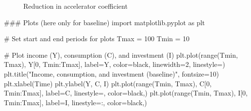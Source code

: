 \documentclass[
  letterpaper,
  DIV=11,
  numbers=noendperiod]{scrreprt}
\newenvironment{Shaded}{\begin{snugshade}}{\end{snugshade}}
\newcommand{\BuiltInTok}[1]{\textcolor[rgb]{0.00,0.23,0.31}{#1}}
\newcommand{\CommentTok}[1]{\textcolor[rgb]{0.37,0.37,0.37}{#1}}
\newcommand{\DecValTok}[1]{\textcolor[rgb]{0.68,0.00,0.00}{#1}}
\newcommand{\ImportTok}[1]{\textcolor[rgb]{0.00,0.46,0.62}{#1}}
\newcommand{\NormalTok}[1]{\textcolor[rgb]{0.00,0.23,0.31}{#1}}
\newcommand{\OperatorTok}[1]{\textcolor[rgb]{0.37,0.37,0.37}{#1}}
\newcommand{\StringTok}[1]{\textcolor[rgb]{0.13,0.47,0.30}{#1}}
\begin{document}
\begin{figure}[H]


\caption{\label{fig-scen4}Reduction in accelerator coefficient}

\end{figure}%

\begin{tcolorbox}[enhanced jigsaw, titlerule=0mm, breakable, bottomrule=.15mm, toprule=.15mm, colbacktitle=quarto-callout-note-color!10!white, rightrule=.15mm, toptitle=1mm, opacityback=0, left=2mm, coltitle=black, title=\textcolor{quarto-callout-note-color}{\faInfo}\hspace{0.5em}{Python code}, colframe=quarto-callout-note-color-frame, opacitybacktitle=0.6, leftrule=.75mm, bottomtitle=1mm, arc=.35mm, colback=white]

\begin{Shaded}
\begin{Highlighting}[]
\CommentTok{\#\#\# Plots (here only for baseline)}
\ImportTok{import}\NormalTok{ matplotlib.pyplot }\ImportTok{as}\NormalTok{ plt}

\CommentTok{\# Set start and end periods for plots}
\NormalTok{Tmax }\OperatorTok{=} \DecValTok{100}
\NormalTok{Tmin }\OperatorTok{=} \DecValTok{10}

\CommentTok{\# Plot income (Y), consumption (C), and investment (I)}
\NormalTok{plt.plot(}\BuiltInTok{range}\NormalTok{(Tmin, Tmax), Y[}\DecValTok{0}\NormalTok{, Tmin:Tmax], label}\OperatorTok{=}\StringTok{\textquotesingle{}Y\textquotesingle{}}\NormalTok{, color}\OperatorTok{=}\StringTok{\textquotesingle{}black\textquotesingle{}}\NormalTok{, linewidth}\OperatorTok{=}\DecValTok{2}\NormalTok{, linestyle}\OperatorTok{=}\StringTok{\textquotesingle{}{-}\textquotesingle{}}\NormalTok{)}
\NormalTok{plt.title(}\StringTok{"Income, consumption, and investment (baseline)"}\NormalTok{, fontsize}\OperatorTok{=}\DecValTok{10}\NormalTok{)}
\NormalTok{plt.xlabel(}\StringTok{\textquotesingle{}Time\textquotesingle{}}\NormalTok{)}
\NormalTok{plt.ylabel(}\StringTok{\textquotesingle{}Y, C, I\textquotesingle{}}\NormalTok{)}
\NormalTok{plt.plot(}\BuiltInTok{range}\NormalTok{(Tmin, Tmax), C[}\DecValTok{0}\NormalTok{, Tmin:Tmax], label}\OperatorTok{=}\StringTok{\textquotesingle{}C\textquotesingle{}}\NormalTok{, linestyle}\OperatorTok{=}\StringTok{\textquotesingle{}{-}{-}\textquotesingle{}}\NormalTok{, color}\OperatorTok{=}\StringTok{\textquotesingle{}black\textquotesingle{}}\NormalTok{,)}
\NormalTok{plt.plot(}\BuiltInTok{range}\NormalTok{(Tmin, Tmax), I[}\DecValTok{0}\NormalTok{, Tmin:Tmax], label}\OperatorTok{=}\StringTok{\textquotesingle{}I\textquotesingle{}}\NormalTok{, linestyle}\OperatorTok{=}\StringTok{\textquotesingle{}:\textquotesingle{}}\NormalTok{, color}\OperatorTok{=}\StringTok{\textquotesingle{}black\textquotesingle{}}\NormalTok{,)}


\end{Highlighting}
\end{Shaded}
\end{tcolorbox}
\end{document}
